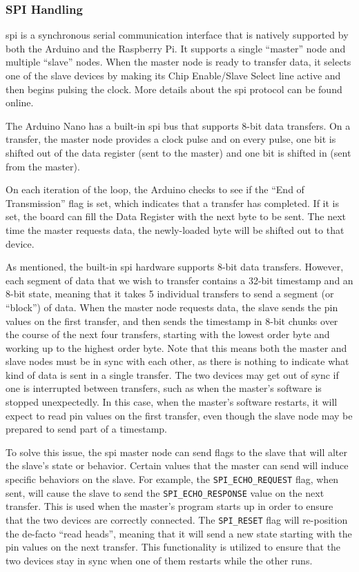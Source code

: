 \documentclass[12pt]{article}
\begin{document}
\subsubsection{SPI Handling}

\gls{spi} is a synchronous serial communication interface that is natively
supported by both the Arduino and the Raspberry Pi.
It supports a single ``master'' node and multiple ``slave'' nodes.
When the master node is ready to transfer data, it selects one of the
slave devices by making its Chip Enable/Slave Select line active and then
begins pulsing the clock.
More details about the \gls{spi} protocol can be found online.

The Arduino Nano has a built-in \gls{spi} bus that supports 8-bit data
transfers.
On a transfer, the master node provides a clock pulse and on every pulse, one
bit is shifted out of the data register (sent to the master) and one bit is
shifted in (sent from the master).

On each iteration of the loop, the Arduino checks to see if the ``End of
Transmission'' flag is set, which indicates that a transfer has completed.
If it is set, the board can fill the Data Register with the next byte to be
sent.
The next time the master requests data, the newly-loaded byte will be shifted
out to that device.

As mentioned, the built-in \gls{spi} hardware supports 8-bit data transfers.
However, each segment of data that we wish to transfer contains a 32-bit
timestamp and an 8-bit state, meaning that it takes 5 individual transfers
to send a segment (or ``block'') of data.
When the master node requests data, the slave sends the pin values on the
first transfer, and then sends the timestamp in 8-bit chunks over the course of
the next four transfers, starting with the lowest order byte and working up to
the highest order byte.
Note that this means both the master and slave nodes must be in sync with
each other, as there is nothing to indicate what kind of data is sent in a
single transfer.
The two devices may get out of sync if one is interrupted between transfers,
such as when the master's software is stopped unexpectedly.
In this case, when the master's software restarts, it will expect to read
pin values on the first transfer, even though the slave node may be prepared
to send part of a timestamp.

To solve this issue, the \gls{spi} master node can send flags to the slave
that will alter the slave's state or behavior.
Certain values that the master can send will induce specific behaviors on the
slave.
For example, the \texttt{SPI\_ECHO\_REQUEST} flag, when sent, will cause the
slave to send the \texttt{SPI\_ECHO\_RESPONSE} value on the next transfer.
This is used when the master's program starts up in order to ensure that the
two devices are correctly connected.
The \texttt{SPI\_RESET} flag will re-position the de-facto ``read heads'',
meaning that it will send a new state starting with the pin values on the next
transfer.
This functionality is utilized to ensure that the two devices stay in sync when
one of them restarts while the other runs.
\end{document}

